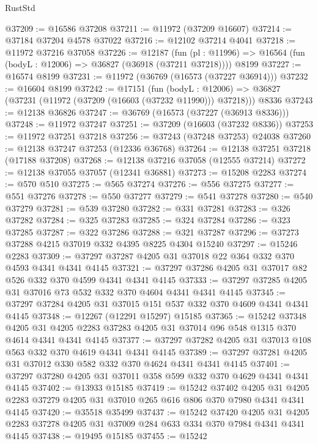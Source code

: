 \begin{lexlean}{RustStd}
\begin{coremodule}
@37209 := @16586 @37208
@37211 := @11972 (@37209 @16607)
@37214 := @37184 @37204 @4578 @37022
@37216 := @12102 @37214 @4041
@37218 := @11972 @37216 @37058
@37226 := @12187
    (fun (pl : @11996) => @16564 (fun (bodyL : @12006) => @36827 (@36918 (@37211 @37218))))
    @8199
@37227 := @16574 @8199
@37231 := @11972 (@36769 (@16573 (@37227 @36914)))
@37232 := @16604 @8199
@37242 := @17151
    (fun (bodyL : @12006) => @36827 (@37231 (@11972 (@37209 (@16603 (@37232 @11990))) @37218)))
    @8336
@37243 := @12138 @36826
@37247 := @36769 (@16573 (@37227 (@36913 @8336)))
@37248 := @11972 @37247
@37251 := @37209 (@16603 (@37232 @8336))
@37253 := @11972 @37251 @37218
@37256 := @37243 (@37248 @37253) @24038
@37260 := @12138 @37247 @37253 (@12336 @36768)
@37264 := @12138 @37251 @37218 (@17188 @37208)
@37268 := @12138 @37216 @37058 (@12555 @37214)
@37272 := @12138 @37055 @37057 (@12341 @36881)
@37273 := @15208 @2283
@37274 := @570 @510
@37275 := @565 @37274
@37276 := @556 @37275
@37277 := @551 @37276
@37278 := @550 @37277
@37279 := @541 @37278
@37280 := @540 @37279
@37281 := @539 @37280
@37282 := @331 @37281
@37283 := @326 @37282
@37284 := @325 @37283
@37285 := @324 @37284
@37286 := @323 @37285
@37287 := @322 @37286
@37288 := @321 @37287
@37296 := @37273 @37288 @4215 @37019 @332 @4395 @8225 @4304 @15240
@37297 := @15246 @2283
@37309 := @37297 @37287 @4205 @31 @37018 @22 @364 @332 @370 @4593 @4341 @4341 @4145
@37321 := @37297 @37286 @4205 @31 @37017 @82 @526 @332 @370 @4599 @4341 @4341 @4145
@37333 := @37297 @37285 @4205 @31 @37016 @73 @532 @332 @370 @4604 @4341 @4341 @4145
@37345 := @37297 @37284 @4205 @31 @37015 @151 @537 @332 @370 @4609 @4341 @4341 @4145
@37348 := @12267 (@12291 @15297) @15185
@37365 := @15242
    @37348
    @4205
    @31
    @4205
    @2283
    @37283
    @4205
    @31
    @37014
    @96
    @548
    @1315
    @370
    @4614
    @4341
    @4341
    @4145
@37377 := @37297 @37282 @4205 @31 @37013 @108 @563 @332 @370 @4619 @4341 @4341 @4145
@37389 := @37297 @37281 @4205 @31 @37012 @330 @582 @332 @370 @4624 @4341 @4341 @4145
@37401 := @37297 @37280 @4205 @31 @37011 @358 @599 @332 @370 @4629 @4341 @4341 @4145
@37402 := @13933 @15185
@37419 := @15242
    @37402
    @4205
    @31
    @4205
    @2283
    @37279
    @4205
    @31
    @37010
    @265
    @616
    @806
    @370
    @7980
    @4341
    @4341
    @4145
@37420 := @35518 @35499
@37437 := @15242
    @37420
    @4205
    @31
    @4205
    @2283
    @37278
    @4205
    @31
    @37009
    @284
    @633
    @334
    @370
    @7984
    @4341
    @4341
    @4145
@37438 := @19495 @15185
@37455 := @15242

\end{coremodule}
\end{lexlean}
